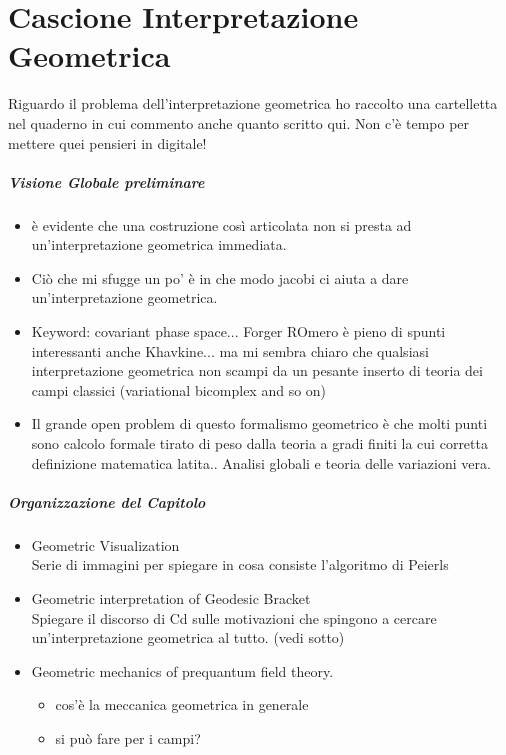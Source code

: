 \documentclass[Main]{subfiles}
\begin{document}
\chapter{Cascione Interpretazione Geometrica}

	\begin{Warning}
		Riguardo il problema dell'interpretazione geometrica ho raccolto una cartelletta nel quaderno in cui commento anche quanto scritto qui. Non c'è tempo per mettere quei pensieri in digitale!
	\end{Warning}


	\paragraph{Visione Globale preliminare}
		\begin{itemize}
			\item 		è evidente che una costruzione così articolata non si presta ad un'interpretazione geometrica immediata.
			\item 		Ciò che mi sfugge un po' è in che modo jacobi ci aiuta a dare  un'interpretazione geometrica.
			\item		Keyword: covariant phase space...  Forger ROmero è pieno di spunti interessanti anche Khavkine... ma mi sembra chiaro che qualsiasi interpretazione geometrica non scampi da un pesante inserto di teoria dei campi classici (variational bicomplex and so on)
			\item		Il grande open problem di questo formalismo geometrico è che molti punti sono calcolo formale tirato di peso dalla teoria a gradi finiti la cui corretta definizione matematica latita.. Analisi globali e teoria delle variazioni vera.
		\end{itemize}

	\paragraph{Organizzazione del Capitolo}
		\begin{itemize}
			\item Geometric Visualization\\
				Serie di immagini per spiegare in cosa consiste l'algoritmo di Peierls
			\item Geometric interpretation of Geodesic Bracket \\
				Spiegare il discorso di Cd sulle motivazioni che spingono a cercare un'interpretazione geometrica al tutto. (vedi sotto)
			\item Geometric mechanics of prequantum field theory.
				\begin{itemize}
					\item cos'è la meccanica geometrica in generale
					\item si può fare per i campi?
				\end{itemize}
		\end{itemize}
\end{document}
